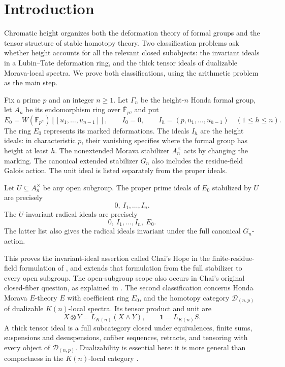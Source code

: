 \section{Introduction}\label{sec:introduction}

Chromatic height organizes both the deformation theory of formal groups
and the tensor structure of stable homotopy theory.  Two classification
problems ask whether height accounts for all the relevant closed
subobjects: the invariant ideals in a Lubin--Tate deformation ring, and
the thick tensor ideals of dualizable Morava-local spectra.  We prove
both classifications, using the arithmetic problem as the main step.

Fix a prime \(p\) and an integer \(n\geq1\).  Let \(\Gamma_n\) be the
height-\(n\) Honda formal group, let \(A_n\) be its endomorphism ring over
\(\overline{\mathbb F}_p\), and put
\[
 E_0=W(\mathbb F_{p^n})[[u_1,\ldots,u_{n-1}]],
 \qquad I_0=0,\qquad
 I_h=(p,u_1,\ldots,u_{h-1})\quad(1\leq h\leq n).
\]
The ring \(E_0\) represents its marked deformations.  The ideals \(I_h\)
are the height ideals: in characteristic \(p\), their vanishing specifies
where the formal group has height at least \(h\).
The nonextended Morava stabilizer \(A_n^\times\) acts by changing the
marking.  The canonical extended stabilizer \(G_n\) also includes the
residue-field Galois action.  The unit ideal is listed separately from
the proper ideals.

\begin{theorem}\label{thm:invariant-radicals}
Let \(U\subseteq A_n^\times\) be any open subgroup.
The proper prime ideals of \(E_0\) stabilized by \(U\) are precisely
\[
 0,\ I_1,\ldots,I_n.
\]
The \(U\)-invariant radical ideals are precisely
\[
 0,\ I_1,\ldots,I_n,\ E_0.
\]
The latter list also gives the radical ideals invariant under the full
canonical \(G_n\)-action.
\end{theorem}

This proves the invariant-ideal assertion called Chai's Hope in the
finite-residue-field formulation of
\cite[Hope~4.1 and Remark~4.2]{BHN22}, and extends that formulation
from the full stabilizer to every open subgroup.  The open-subgroup
scope also occurs in Chai's original closed-fiber question, as explained
in \cite[Remark~4.2]{BHN22}.  The second classification concerns Honda
Morava \(E\)-theory \(E\) with coefficient ring \(E_0\), and the
homotopy category \(\mathcal D_{(n,p)}\) of dualizable \(K(n)\)-local
spectra.  Its tensor product and unit are
\[
 X\otimes Y=L_{K(n)}(X\wedge Y),
 \qquad \mathbf 1=L_{K(n)}S.
\]
A thick tensor ideal is a full subcategory closed under equivalences,
finite sums, suspensions and desuspensions, cofiber sequences, retracts,
and tensoring with every object of \(\mathcal D_{(n,p)}\).
Dualizability is essential here: it is more general than compactness in
the \(K(n)\)-local category \cite[Theorems~8.5--8.6]{HS99}.

